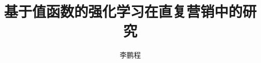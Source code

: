 \documentclass[master]{ustcthesis}
\title{基于值函数的强化学习在直复营销中的研究}
\author{李鹏程}
\begin{document}
\maketitle


\frontmatter
% 

\tableofcontents
\listoffigures
\listoftables
\listofalgorithms

\mainmatter






% 
% 
% 
% 
% 
% 
% 
% 


\appendix


\backmatter


\end{document}
